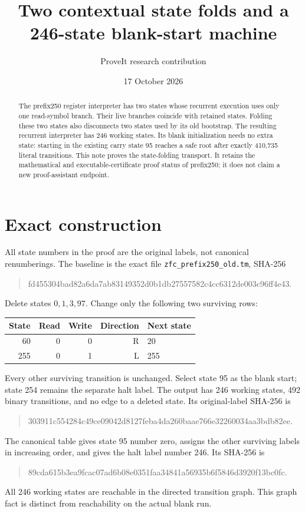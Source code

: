 \documentclass[11pt]{article}
\title{Two contextual state folds and a 246-state blank-start machine}
\author{ProveIt research contribution}
\date{17 October 2026}
\begin{document}
\maketitle

\begin{abstract}
The prefix250 register interpreter has two states whose recurrent execution
uses only one read-symbol branch. Their live branches coincide with retained
states. Folding these two states also disconnects two states used by its old
bootstrap. The resulting recurrent interpreter has 246 working states. Its
blank initialization needs no extra state: starting in the existing carry
state 95 reaches a safe root after exactly 410,735 literal transitions.
This note proves the state-folding transport. It retains the mathematical
and executable-certificate proof status of prefix250; it does not claim a
new proof-assistant endpoint.
\end{abstract}

\section{Exact construction}

All state numbers in the proof are the original labels, not canonical
renumberings. The baseline is the exact file
\texttt{zfc\_prefix250\_old.tm}, SHA-256
\begin{quote}\small\ttfamily
fd455304bad82a6da7ab83149352d0b1db27557582c4cc6312de003c96ff4e43.
\end{quote}
Delete states $0,1,3,97$. Change only the following two surviving rows:
\begin{center}
\begin{tabular}{rrrrl}
\toprule
State & Read & Write & Direction & Next state\\
\midrule
60 & 0 & 0 & R & 20\\
255 & 0 & 1 & L & 255\\
\bottomrule
\end{tabular}
\end{center}
Every other surviving transition is unchanged. Select state 95 as the blank
start; state 254 remains the separate halt label. The output has 246 working
states, 492 binary transitions, and no edge to a deleted state. Its
original-label SHA-256 is
\begin{quote}\small\ttfamily
303911c554284c49ce09042d8127feba4da260baae766e32260034aa3bdb82ee.
\end{quote}
The canonical table gives state 95 number zero, assigns the other surviving
labels in increasing order, and gives the halt label number 246. Its
SHA-256 is
\begin{quote}\small\ttfamily
89cda615b3ea9fcac07ad6b08e0351faa34841a56935b6f5846d3920f13bc0fc.
\end{quote}
All 246 working states are reachable in the directed transition graph.
This graph fact is distinct from reachability on the actual blank run.
\end{document}
